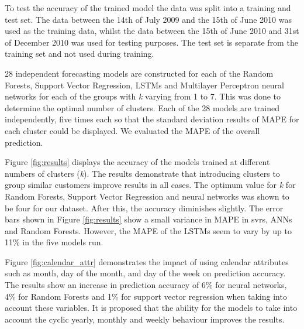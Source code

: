 To test the accuracy of the trained model the data was split into a training and test set. The data between the 14th of July 2009 and the 15th of June 2010 was used as the training data, whilst the data between the 15th of June 2010 and 31st of December 2010 was used for testing purposes. The test set is separate from the training set and not used during training. 

28 independent forecasting models are constructed for each of the Random Forests, Support Vector Regression, LSTMs and Multilayer Perceptron neural networks for each of the groups with \textit{k} varying from 1 to 7. This was done to determine the optimal number of clusters.  Each of the 28 models are trained independently, five times each so that the standard deviation results of MAPE for each cluster could be displayed. We evaluated the MAPE of the overall prediction. 

Figure \ref{fig:results} displays the accuracy of the models trained at different numbers of clusters (\textit{k}). The results demonstrate that introducing clusters to group similar customers improve results in all cases. The optimum value for \textit{k} for Random Forests, Support Vector Regression and neural networks was shown to be four for our dataset. After this, the accuracy diminishes slightly. The error bars shown in Figure \ref{fig:results} show a small variance in MAPE in \acrshort{svr}s, ANNs and Random Forests. However, the MAPE of the LSTMs seem to vary by up to 11\% in the five models run. 

Figure \ref{fig:calendar_attr} demonstrates the impact of using calendar attributes such as month, day of the month, and day of the week on prediction accuracy. The results show an increase in prediction accuracy of 6\% for neural networks, 4\% for Random Forests and 1\% for support vector regression when taking into account these variables. It is proposed that the ability for the models to take into account the cyclic yearly, monthly and weekly behaviour improves the results.

